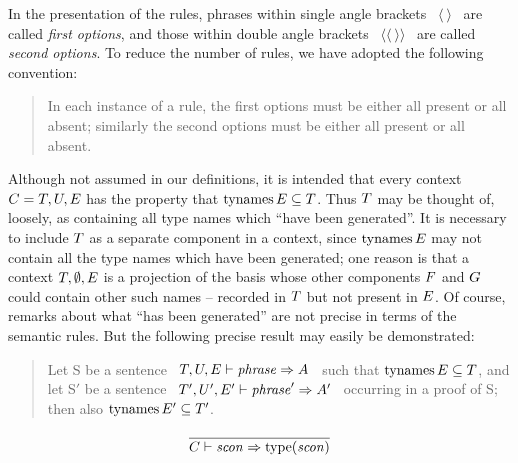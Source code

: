 In the presentation of the rules, phrases within single
angle brackets ~$\langle\ \rangle$~ are called {\sl
first options}, and those within double
angle brackets ~$\langle\langle\ \rangle\rangle$~ are called {\sl
second options}.  To reduce the number of rules, we have adopted the
following convention:
\begin{quote} In each instance of a rule, the
first options must be either all present or all absent;
similarly the second options must be either all present or all absent.
\end{quote}

Although not assumed in our definitions, it is intended that every
context $C=T,U,E$ has the property that $\mathop{\rm tynames}\nolimits E\subseteq T$.
Thus $T$ may be thought of, loosely, as containing all type names
which ``have been generated''. It is necessary to include $T$ as a
separate component in a context, since $\mathop{\rm tynames}\nolimits E$ may not contain
all the type names which have been generated; one reason is that a
context $T,\emptyset,E$ is a projection of the basis
\replacement{\thenostrsharing}{$\B=(\M,\T),\F,\G,\E$}{$\B=\T,\F,\G,\E$}
whose other components $F$ and $G$
could contain other such names -- recorded in $T$ but not present in
$E$.  Of course, remarks about what ``has been generated'' are not
precise in terms of the semantic rules. But the following precise result
may easily be demonstrated:
\begin{quote}
Let S be a sentence
~$T,U,E\vdash{\it phrase}\Rightarrow A$~ such that
$\mathop{\rm tynames}\nolimits E\subseteq T$,
and let S$'$ be a sentence
~$T',U',E'\vdash{\it phrase}'\Rightarrow A'$~
occurring in a proof of S; then also
$\mathop{\rm tynames}\nolimits E'\subseteq T'$.
\end{quote}



%

\begin{equation}        %
\label{sconexp-rule}
\frac{}
     {\C\ts\scon\ra\scontype(\scon)}\index{26.3}
\end{equation}

\replacement{\theidstatus}{\begin{equation}        %
\label{varexp-rule}
\frac{\C(\longvar)\succ\tau}
     {\C\ts\longvar\ra\tau}
\end{equation}}{\begin{equation}        %
\label{varexp-rule}
\frac{\C(\longvid) = (\sigma,\is)\qquad\sigma\succ\tau}
     {\C\ts\longvid\ra\tau}
\end{equation}}

